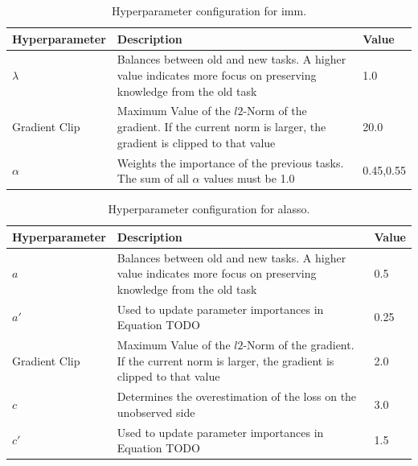 \begin{table}[h!]
    \begin{tabularx}{\textwidth}{| l | X | l |} 
        \hline
        Hyperparameter & Description & Value \\ 
        \hline 
        $\lambda$ & Balances between old and new tasks. A higher value indicates \newline more focus
        on preserving knowledge \newline from the old task & 1.0  \\ 
        Gradient Clip & Maximum Value of the $l2$-Norm of the gradient. If \newline the current norm is larger, the
        gradient is clipped to that value & 20.0 \\ 
        $\alpha$ & Weights the importance of the previous tasks. The sum of all $\alpha$ values must be 1.0 & 0.45,0.55 \\
        \hline
    \end{tabularx}
    \caption{Hyperparameter configuration for \gls{imm}.}
    \label{fig:IMMparams}
\end{table}

\begin{table}[h!]
    \centering
    \begin{tabularx}{\textwidth}{| l | X | l |} 
        \hline
        Hyperparameter & Description & Value \\ 
        \hline 
        $a$ & Balances between old and new tasks. A higher value indicates \newline more focus
        on preserving knowledge from the old task & 0.5  \\ 
        $a'$ & Used to update parameter importances in Equation TODO & 0.25  \\
        Gradient Clip & Maximum Value of the $l2$-Norm of the gradient. If \newline the current norm is larger, the
        gradient is clipped to that value & 2.0 \\ 
        $c$ & Determines the overestimation of the loss on the unobserved side & 3.0 \\
        $c'$ & Used to update parameter importances in Equation TODO & 1.5 \\
        \hline
    \end{tabularx}
    \caption{Hyperparameter configuration for \gls{alasso}.}
    \label{fig:AlassoParams}
\end{table}


